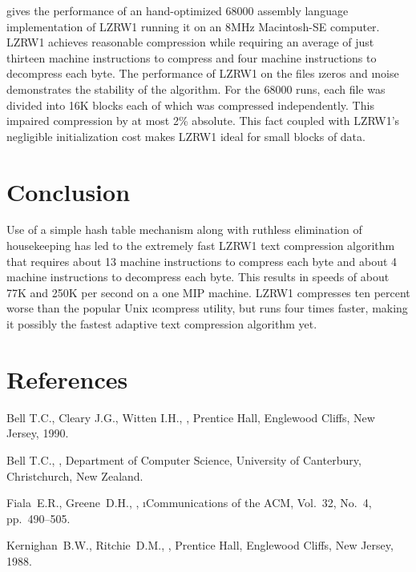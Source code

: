   gives  the  performance  of  an  hand-optimized  68000
assembly  language  implementation of  LZRW1  running  it on  an  8MHz
Macintosh-SE  computer. LZRW1  achieves  reasonable compression  while
requiring an average of just thirteen machine instructions to compress
and four machine instructions to decompress each byte. The performance
of  LZRW1  on  the  files \i{zeros}  and  \i{noise}  demonstrates  the
stability of the algorithm. For the  68000 runs, each file was divided
into  16K blocks  each  of which  was  compressed independently.  This
impaired compression by  at most 2\% absolute. This  fact coupled with
LZRW1's  negligible initialization  cost makes  LZRW1 ideal  for small
blocks of data.

\section{Conclusion}

Use of a  simple hash table mechanism along  with ruthless elimination
of housekeeping has  led to the extremely fast  LZRW1 text compression
algorithm that requires about 13 machine instructions to compress each
byte and  about 4 machine  instructions to decompress each  byte. This
results  in speeds  of about  77K and  250K per  second on  a one  MIP
machine.  LZRW1 compresses  ten percent  worse than  the popular  Unix
\i{compress} utility, but  runs four times faster,  making it possibly
the fastest adaptive text compression algorithm yet.

\section{References}

  Bell   T.C.,  Cleary  J.G.,  Witten   I.H.,  , Prentice Hall, Englewood Cliffs, New Jersey, 1990.

\noindent{} Bell T.C., ,   Department   of  Computer   Science,
University of Canterbury, Christchurch, New Zealand.

\noindent{} Fiala~E.R., Greene~D.H., , \i{Communications of the  ACM}, Vol.~32, No.~4,
pp.~490--505.

\noindent{}  Kernighan~B.W., Ritchie~D.M.,  ,  Prentice Hall,  Englewood Cliffs,  New Jersey,
1988.

